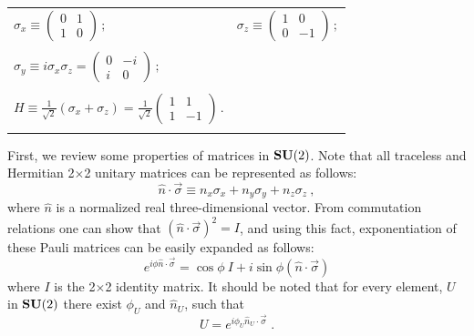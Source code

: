 \documentclass[twocolumn,11pt]{article}
\begin{document}
\begin{tabular}{ll}
$\sigma_x\equiv
\left(\begin{array}{cc} 0 & 1 \\ 1 &  0 \end{array} \right)\, ;$ &
\hspace*{-1.2in} $\sigma_z\equiv
\left(\begin{array}{rr} 1 & 0 \\ 0 & -1 \end{array} \right)\, ;$ \\ \\
$\sigma_y\equiv i\sigma_x\sigma_z = \left(\begin{array}{cc} 0 & -i \\ 
i &  0 \end{array} \right)\, ;$ & \\ \\
$H\equiv\frac{1}{\sqrt{2}}(\sigma_x+\sigma_z)= \frac{1}{\sqrt{2}}\left(
\begin{array}{cc} 1 & 1 \\ 1 &  -1 
\end{array} \right)\, .$ & \\ \\
\end{tabular}

First, we review some properties of matrices in $\mbox{\bf SU}(2)$. Note
that all traceless and Hermitian 2$\times$2 unitary matrices can be
represented as follows:
\[ \hat{n} \cdot \vec{\sigma}\equiv n_x
\sigma_x + n_y \sigma_y +n_z \sigma_z \ , \]
where $\hat{n}$ is a normalized real three-dimensional vector. From
commutation relations one can show that $\displaystyle 
{(\hat{n} \cdot \vec{\sigma})}^2=I$, and using this fact,
exponentiation of these Pauli matrices can be easily expanded as follows:
\[ e^{i\phi\hat{n} \cdot \vec{\sigma}}=\cos\phi\
I + i\sin\phi(\hat{n} \cdot \vec{\sigma})
\]
where $I$ is the 2$\times$2 identity matrix.  It should be noted that for
every element, $U$ in $\mbox{\bf SU}(2)$ there exist $\phi_{U}$ and
${\hat{n}}_U$,
such that \cite{SU2rep}
\[ U=e^{i\phi_U{\hat{n}}_U \cdot \vec{\sigma}}\; . \]
\end{document}
